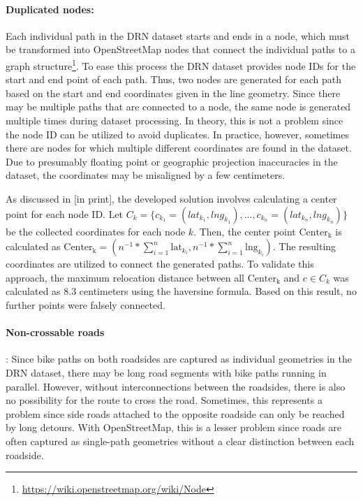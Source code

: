 \paragraph{Duplicated nodes:} Each individual path in the DRN dataset starts and ends in a node, which must be transformed into OpenStreetMap nodes that connect the individual paths to a graph structure\footnote{\url{https://wiki.openstreetmap.org/wiki/Node}}. To ease this process the DRN dataset provides node IDs for the start and end point of each path. Thus, two nodes are generated for each path based on the start and end coordinates given in the line geometry. Since there may be multiple paths that are connected to a node, the same node is generated multiple times during dataset processing. In theory, this is not a problem since the node ID can be utilized to avoid duplicates. In practice, however, sometimes there are nodes for which multiple different coordinates are found in the dataset. Due to presumably floating point or geographic projection inaccuracies in the dataset, the coordinates may be misaligned by a few centimeters.

As discussed in [in print], the developed solution involves calculating a center point for each node ID. Let $C_k = \{c_{k_1} = (lat_{k_1}, lng_{k_1}), \text{...} , c_{k_n} = (lat_{k_n}, lng_{k_n})\}$ be the collected coordinates for each node $k$. Then, the center point $\text{Center}_{\text{k}}$ is calculated as $\text{Center}_{\text{k}} = \left(n^{-1} * {\sum_{i=1}^{n} \text{{lat}}_{k_i}}, {n^{-1} * \sum_{i=1}^{n} \text{{lng}}_{k_i}}\right)$. The resulting coordinates are utilized to connect the generated paths. To validate this approach, the maximum relocation distance between all $\text{Center}_{\text{k}}$ and $c \in C_k$ was calculated as 8.3 centimeters using the haversine formula. Based on this result, no further points were falsely connected.

\paragraph{Non-crossable roads}: Since bike paths on both roadsides are captured as individual geometries in the DRN dataset, there may be long road segments with bike paths running in parallel. However, without interconnections between the roadsides, there is also no possibility for the route to cross the road. Sometimes, this represents a problem since side roads attached to the opposite roadside can only be reached by long detours. With OpenStreetMap, this is a lesser problem since roads are often captured as single-path geometries without a clear distinction between each roadside. 


